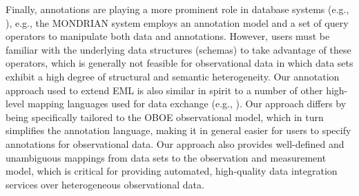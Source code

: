 Finally, annotations are playing a more prominent role in
database systems (e.g.,
\cite{GeertsKM06,Reeve05SemanticAnnotation,BhagwatCTV04}), e.g., the
MONDRIAN system \cite{GeertsKM06} employs an annotation model and a
set of query operators to manipulate both data and annotations.
However, users must be familiar with the underlying data structures
(schemas) to take advantage of these operators, which is generally not
feasible for observational data in which data sets exhibit a high
degree of structural and semantic heterogeneity. Our annotation
approach used to extend EML is also similar in spirit to a number of
other high-level mapping languages used for data exchange (e.g.,
\cite{fagin09:_clio,an06:_build_seman_mappin_datab_ontol}). Our
approach differs by being specifically tailored to the OBOE
observational model, which in turn simplifies the annotation language,
making it in general easier for users to specify annotations for
observational data. Our approach also provides well-defined and
unambiguous mappings from data sets to the observation and measurement
model, which is critical for providing automated, high-quality data
integration services over heterogeneous observational data.




